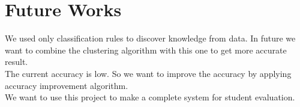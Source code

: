 
\section{Future Works}

We used only classification rules to discover knowledge from data. In future we want to combine the clustering algorithm  with this one to get more accurate result.
\\The current accuracy is low. So we want to improve the accuracy by applying accuracy improvement algorithm.
\\We want to use this project to make a complete system for student evaluation.
  


